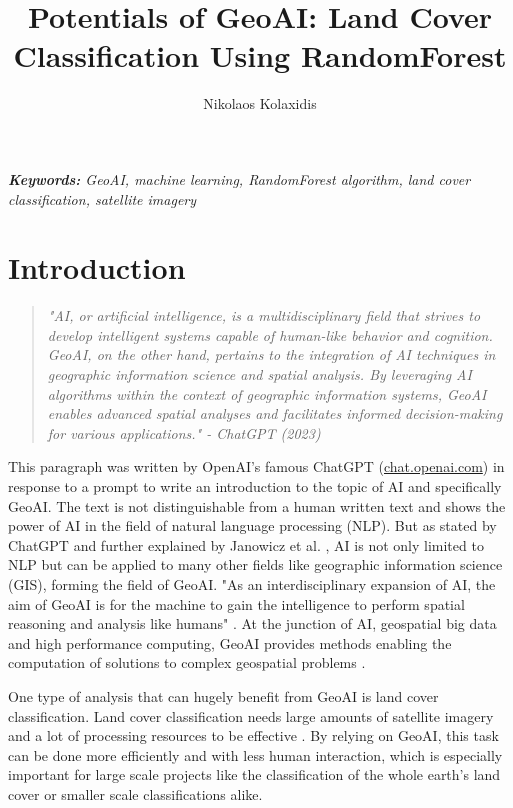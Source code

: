 \documentclass[oneside,twocolumn,10pt,cleanfoot,cleanhead]{asme2ej}
\title{
    Potentials of GeoAI: Land Cover Classification Using RandomForest
}
\author{
    Nikolaos Kolaxidis
    \affiliation{
	M.Sc. Geography\\
    pd281@uni-heidelberg.de\\
    Heidelberg University\\
    12.07.2023
    }	
}
\begin{document}
\maketitle


\textit{
    \textbf{Keywords:} GeoAI, machine learning, RandomForest algorithm, land cover classification, satellite imagery
}


\section{Introduction}

\begin{quote}
    \textit{"AI, or artificial intelligence, is a multidisciplinary field that strives to develop intelligent systems capable of human-like behavior and cognition.
    GeoAI, on the other hand, pertains to the integration of AI techniques in geographic information science and spatial analysis.
    By leveraging AI algorithms within the context of geographic information systems, GeoAI enables advanced spatial analyses and facilitates informed decision-making for various applications." - ChatGPT (2023)}
\end{quote}

\vspace{1ex}

This paragraph was written by OpenAI's famous ChatGPT (\url{chat.openai.com}) in response to a prompt to write an introduction to the topic of AI and specifically GeoAI. 
The text is not distinguishable from a human written text and shows the power of AI in the field of natural language processing (NLP).
But as stated by ChatGPT and further explained by Janowicz et al. \cite{JanowiczEA2020}, AI is not only limited to NLP but can be applied to many other fields like geographic information science (GIS), forming the field of GeoAI.
"As an interdisciplinary expansion of AI, the aim of GeoAI is for the machine to gain the intelligence to perform spatial reasoning and analysis like humans" \cite{Li2020}.
At the junction of AI, geospatial big data and high performance computing, GeoAI provides methods enabling the computation of solutions to complex geospatial problems \cite{Li2020}.

One type of analysis that can hugely benefit from GeoAI is land cover classification.
Land cover classification needs large amounts of satellite imagery and a lot of processing resources to be effective \cite{PhanEA2020}.
By relying on GeoAI, this task can be done more efficiently and with less human interaction, which is especially important for large scale projects like the classification of the whole earth's land cover or smaller scale classifications alike.
\end{document}
